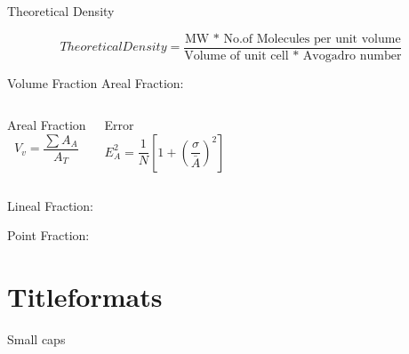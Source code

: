 \documentclass[10pt]{beamer}
\begin{document}
{%
\begin{frame}[fragile]{Theoretical Density}

\begin{equation*}
Theoretical Density = \dfrac{\text{MW * No.of Molecules per unit volume}}{\text{Volume of unit cell * Avogadro number}}
\end{equation*}   
    
\end{frame}
}
{%
\begin{frame}[fragile]{Volume Fraction}
Areal Fraction:
  \begin{columns}[T,onlytextwidth]
 
\begin{block}{Areal Fraction}
\begin{equation*}
V_{v} = \dfrac{\sum A_{A}}{A_{T}}
\end{equation*} 
\end{block}
 

\begin{block}{Error}
\begin{equation*}
E_{A}^{2} = \dfrac{1}{N}\left[ 1+ \left( \dfrac{\sigma}{\bar{A}} \right)^{2} \right]
\end{equation*} 
\end{block}

\end{columns}

Lineal Fraction:


Point Fraction:



 
    
\end{frame}
}
\section{Titleformats}



{
\begin{frame}{Small caps}

\end{frame}
}
\end{document}
